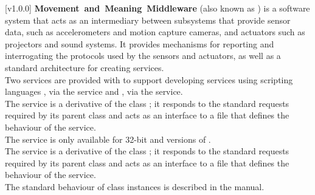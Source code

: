 [v1.0.0]
\textbf{Movement~and~Meaning~Middleware} (also known as \mplusm{}) is a software system
that acts as an intermediary between subsystems that provide sensor data, such as
accelerometers and motion capture cameras, and actuators such as projectors and sound
systems.
It provides mechanisms for reporting and interrogating the protocols used by the sensors
and actuators, as well as a standard architecture for creating services.\\

Two services are provided with \mplusm{} to support developing services using scripting
languages \longDash{} \CL, via the \CLF{} service and \JS, via the \JSF{} service.\\

The \CLF{} service is a derivative of the \mplusm{} class ;
it responds to the standard requests required by its parent class and acts as an interface
to a \CL{} file that defines the behaviour of the service.\\

The \CLF{} service is only available for \win{} 32-bit and \mac{} versions of \mplusm.\\

The \JSF{} service is a derivative of the \mplusm{} class ;
it responds to the standard requests required by its parent class and acts as an interface
to a \JS{} file that defines the behaviour of the service.\\

The standard behaviour of  class instances is described in
the \emph{\MMM} manual.
\primaryEnd{}
